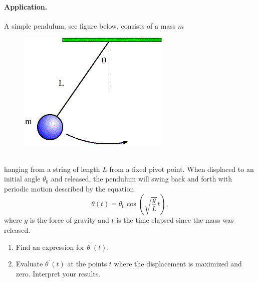 \documentclass{article}
\begin{document}
\paragraph*{Application.} A simple pendulum, see figure below, consists of a mass $m$ 
\begin{figure}[h]
\centering
\includegraphics[scale=0.5]{../reviews/review1_fig1}
\end{figure}\\
hanging from a string of length $L$ from a fixed pivot point. When displaced to an initial angle $\theta_{0}$ and released, the pendulum will swing back and forth with periodic motion described by the equation
\[
\theta(t)=\theta_{0}\cos(\sqrt{\frac{g}{L}}t),
\]
where $g$ is the force of gravity and $t$ is the time elapsed since the mass was released. 
\begin{enumerate}
\item	Find an expression for $\theta^{'}(t)$.
\item	Evaluate $\theta^{'}(t)$ at the points $t$ where the displacement is maximized and zero. Interpret your results. 
\end{enumerate}
\end{document}
